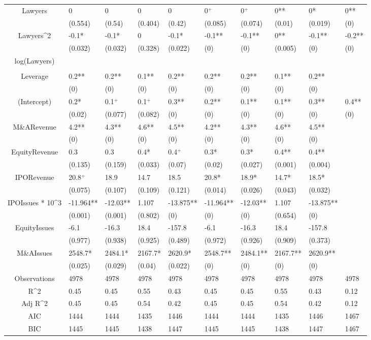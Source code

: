 \documentclass{article}
\begin{document}
\begin{table}[H]
\begin{tabular}{|clllllllll|}
Lawyers & 0 & 0 & 0 & 0 & 0$^{+}$ & 0$^{+}$ & 0** & 0* & 0** \\ 
   & (0.554) & (0.54) & (0.404) & (0.42) & (0.085) & (0.074) & (0.01) & (0.019) & (0) \\ 
  Lawyers^2 & -0.1* & -0.1* & 0 & -0.1* & -0.1** & -0.1** & 0** & -0.1** & -0.2** \\ 
   & (0.032) & (0.032) & (0.328) & (0.022) & (0) & (0) & (0.005) & (0) & (0) \\ 
  log(Lawyers) &  &  &  &  &  &  &  &  &  \\ 
   &  &  &  &  &  &  &  &  &  \\ 
  Leverage & 0.2** & 0.2** & 0.1** & 0.2** & 0.2** & 0.2** & 0.1** & 0.2** &  \\ 
   & (0) & (0) & (0) & (0) & (0) & (0) & (0) & (0) &  \\ 
  (Intercept) & 0.2* & 0.1$^{+}$ & 0.1$^{+}$ & 0.3** & 0.2** & 0.1** & 0.1** & 0.3** & 0.4** \\ 
   & (0.02) & (0.077) & (0.082) & (0) & (0) & (0) & (0) & (0) & (0) \\ 
  M\&ARevenue & 4.2** & 4.3** & 4.6** & 4.5** & 4.2** & 4.3** & 4.6** & 4.5** &  \\ 
   & (0) & (0) & (0) & (0) & (0) & (0) & (0) & (0) &  \\ 
  EquityRevenue & 0.3 & 0.3 & 0.4* & 0.4$^{+}$ & 0.3* & 0.3* & 0.4** & 0.4** &  \\ 
   & (0.135) & (0.159) & (0.033) & (0.07) & (0.02) & (0.027) & (0.001) & (0.004) &  \\ 
  IPORevenue & 20.8$^{+}$ & 18.9 & 14.7 & 18.5 & 20.8* & 18.9* & 14.7* & 18.5* &  \\ 
   & (0.075) & (0.107) & (0.109) & (0.121) & (0.014) & (0.026) & (0.043) & (0.032) &  \\ 
  IPOIssues * 10^3 & -11.964** & -12.03** & 1.107 & -13.875** & -11.964** & -12.03** & 1.107 & -13.875** &  \\ 
   & (0.001) & (0.001) & (0.802) & (0) & (0) & (0) & (0.654) & (0) &  \\ 
  EquityIssues & -6.1 & -16.3 & 18.4 & -157.8 & -6.1 & -16.3 & 18.4 & -157.8 &  \\ 
   & (0.977) & (0.938) & (0.925) & (0.489) & (0.972) & (0.926) & (0.909) & (0.373) &  \\ 
  M\&AIssues & 2548.7* & 2484.1* & 2167.7* & 2620.9* & 2548.7** & 2484.1** & 2167.7** & 2620.9** &  \\ 
   & (0.025) & (0.029) & (0.04) & (0.022) & (0) & (0) & (0) & (0) &  \\ 
  \hline 
 Observations & 4978 & 4978 & 4978 & 4978 & 4978 & 4978 & 4978 & 4978 & 4978 \\ 
  R^2 & 0.45 & 0.45 & 0.55 & 0.43 & 0.45 & 0.45 & 0.55 & 0.43 & 0.12 \\ 
  Adj R^2 & 0.45 & 0.45 & 0.54 & 0.42 & 0.45 & 0.45 & 0.54 & 0.42 & 0.12 \\ 
  AIC & 1444 & 1444 & 1435 & 1446 & 1444 & 1444 & 1435 & 1446 & 1467 \\ 
  BIC & 1445 & 1445 & 1438 & 1447 & 1445 & 1445 & 1438 & 1447 & 1467 \\ 
   \hline
\end{tabular}
 

\end{table}
\end{document}
